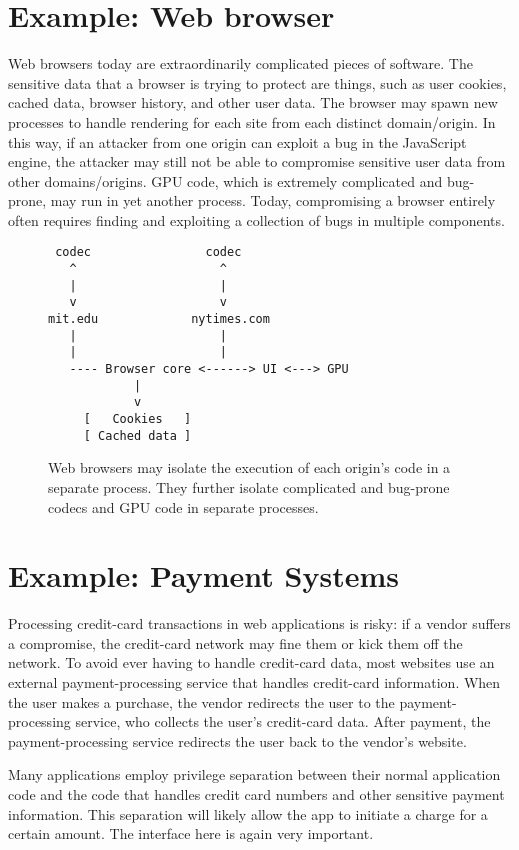 \section{Example: Web browser}

Web browsers today are extraordinarily complicated pieces of software.
The sensitive data that a browser is trying to protect are things, such as
user cookies, cached data, browser history, and other user data.
The browser may spawn new processes to handle rendering for each site
from each distinct domain/origin.
In this way, if an attacker from one origin can exploit a bug in the
JavaScript engine, the attacker may still not be able to compromise
sensitive user data from other domains/origins.
GPU code, which is extremely complicated and bug-prone, may run in 
yet another process.
Today, compromising a browser entirely often requires finding and exploiting
a collection of bugs in multiple components.
\begin{figure}
\begin{verbatim}
 codec                codec
   ^                    ^
   |                    |
   v                    v
mit.edu             nytimes.com
   |                    |
   |                    | 
   ---- Browser core <------> UI <---> GPU
            |
            v
     [   Cookies   ]
     [ Cached data ]
\end{verbatim}
\caption{Web browsers may isolate the execution of each origin's 
  code in a separate process. They further isolate complicated
  and bug-prone codecs and GPU code in separate processes.}
\end{figure}

\section{Example: Payment Systems}
Processing credit-card transactions in web applications is risky:
if a vendor suffers a compromise, the credit-card network may fine
them or kick them off the network.
To avoid ever having to handle credit-card data, most websites 
use an external payment-processing service that handles credit-card information.
When the user makes a purchase, the vendor redirects the user to the 
payment-processing service, who collects the user's credit-card data.
After payment, the payment-processing service redirects the user
back to the vendor's website.

Many applications employ privilege separation between their normal application code and the code that handles credit card numbers and other sensitive payment information. This separation will likely allow the app to initiate a charge for a certain amount. The interface here is again very important.

